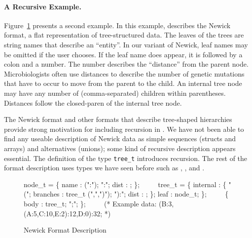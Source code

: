 \paragraph*{A Recursive \ipads{} Example.}
Figure~\ref{fig:ipads-newick} presents a second \ipads{} example.
In this example, \ipads{} describes the Newick format, a flat
representation of tree-structured data.  The leaves of the trees
are string names that describe an ``entity''.   In our variant of Newick, 
leaf names may be omitted if the user chooses.  If the leaf name does appear,
it is followed by a colon and a number.  The number describes the ``distance''
from the parent node.  Microbiologists often use
distances to describe the
number of genetic mutations that have to occur to move from the parent 
to the child.  An internal tree node may have any number of (comma-separated)
children within parentheses.  Distances follow the closed-paren
of the internal tree node.

The Newick format and other formats that describe tree-shaped 
hierarchies~\cite{geneontology,newick}
provide strong motivation for including recursion in \ipads.  
We have not been able to find any useable description of Newick data as
simple sequences (structs and arrays) and alternatives (unions); some
kind of recursive description appears essential.
The definition of the type {\tt tree\_t} introduces recursion.
The rest of the format description uses types we have seen before such as
\Pstruct, \Parray{}, and \Punion.


\begin{figure}

\begin{code}
node\_t = \Popt \Pstruct \{
                name : \Pstring(":"); ":";
                dist : \Puint;  
              \};
\(\qquad\)
\Prec tree\_t =
  \Punion \{
    internal : 
      \Pstruct \{
        "(";
        branches : tree\_t \Parray(",",")");
        "):";
        dist : \Puint;
      \};
    leaf : node\_t;
  \};
\(\qquad\)
\Pstruct \{
  body : tree\_t;
  ";";
\};
\(\qquad\)
(* Example data:
   (B:3,(A:5,C:10,E:2):12,D:0):32;
*)

\end{code}
\caption{\ipads{} Newick Format Description}
\label{fig:ipads-newick}

\end{figure}

